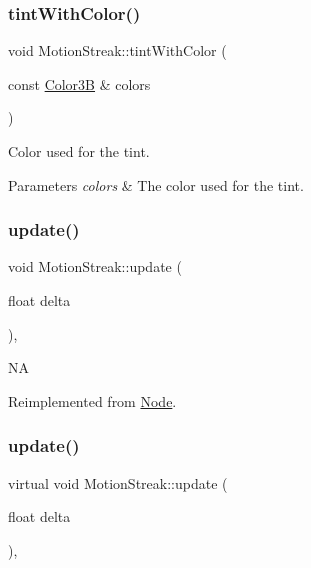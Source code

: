\subsubsection{\texorpdfstring{tint\+With\+Color()}{tintWithColor()}\hspace{0.1cm}{\footnotesize\ttfamily [2/2]}}
{\footnotesize\ttfamily void Motion\+Streak\+::tint\+With\+Color (\begin{DoxyParamCaption}\item[{const \hyperlink{structColor3B}{Color3B} \&}]{colors }\end{DoxyParamCaption})}

Color used for the tint.


\begin{DoxyParams}{Parameters}
{\em colors} & The color used for the tint. \\
\hline
\end{DoxyParams}
\mbox{\label{classMotionStreak_a915b84eec6e1e4576d9aa0c1e6528fe7}} 
\subsubsection{\texorpdfstring{update()}{update()}\hspace{0.1cm}{\footnotesize\ttfamily [1/2]}}
{\footnotesize\ttfamily void Motion\+Streak\+::update (\begin{DoxyParamCaption}\item[{float}]{delta }\end{DoxyParamCaption})\hspace{0.3cm}{\ttfamily [override]}, {\ttfamily [virtual]}}

NA 

Reimplemented from \hyperlink{classNode_a32878481ba54b3856ab53c10af13848e}{Node}.

\mbox{\label{classMotionStreak_a03d1e1113084f8e91b537539e7c19b9c}} 
\subsubsection{\texorpdfstring{update()}{update()}\hspace{0.1cm}{\footnotesize\ttfamily [2/2]}}
{\footnotesize\ttfamily virtual void Motion\+Streak\+::update (\begin{DoxyParamCaption}\item[{float}]{delta }\end{DoxyParamCaption})\hspace{0.3cm}{\ttfamily [override]}, {\ttfamily [virtual]}}

